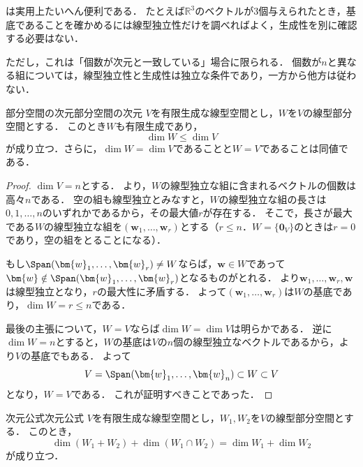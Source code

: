 \begin{remark}[次元による基底の判定の注意]
  は実用上たいへん便利である．
  たとえば$\mathbb{R}^3$のベクトルが$3$個与えられたとき，基底であることを確かめるには線型独立性だけを調べればよく，生成性を別に確認する必要はない．

  ただし，これは「個数が次元と一致している」場合に限られる．
  個数が$n$と異なる組については，線型独立性と生成性は独立な条件であり，一方から他方は従わない．
\end{remark}

\begin{prop}{部分空間の次元}{部分空間の次元}
  $V$を有限生成な線型空間とし，$W$を$V$の線型部分空間とする．
  このとき$W$も有限生成であり，
  \[
    \dim W \le \dim V
  \]
  が成り立つ．さらに，$\dim W = \dim V$であることと$W = V$であることは同値である．
\end{prop}

\begin{leftbar}
\begin{proof}
  $\dim V = n$とする．
  より，$W$の線型独立な組に含まれるベクトルの個数は高々$n$である．
  空の組も線型独立とみなすと，$W$の線型独立な組の長さは$0, 1, \dots, n$のいずれかであるから，その最大値$r$が存在する．
  そこで，長さが最大である$W$の線型独立な組を$(\bm{w}_1, \dots, \bm{w}_r)$とする（$r \le n$．$W = \{\bm{0}_V\}$のときは$r = 0$であり，空の組をとることになる）．

  もし$\Span(\bm{w}_1, \dots, \bm{w}_r) \ne W$ならば，$\bm{w} \in W$であって$\bm{w} \notin \Span(\bm{w}_1, \dots, \bm{w}_r)$となるものがとれる．
  より$\bm{w}_1, \dots, \bm{w}_r, \bm{w}$は線型独立となり，$r$の最大性に矛盾する．
  よって$(\bm{w}_1, \dots, \bm{w}_r)$は$W$の基底であり，$\dim W = r \le n$である．

  最後の主張について，$W = V$ならば$\dim W = \dim V$は明らかである．
  逆に$\dim W = n$とすると，$W$の基底は$V$の$n$個の線型独立なベクトルであるから，より$V$の基底でもある．
  よって
  \[
    V = \Span(\bm{w}_1, \dots, \bm{w}_n) \subset W \subset V
  \]
  となり，$W = V$である．
  これが証明すべきことであった．
\end{proof}
\end{leftbar}

\begin{theorem}{次元公式}{次元公式}
  $V$を有限生成な線型空間とし，$W_1, W_2$を$V$の線型部分空間とする．
  このとき，
  \[
    \dim(W_1 + W_2) + \dim(W_1 \cap W_2) = \dim W_1 + \dim W_2
  \]
  が成り立つ．
\end{theorem}

